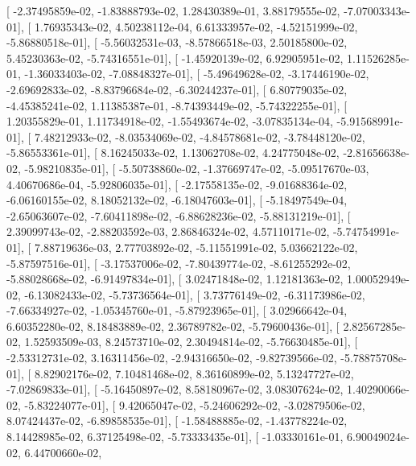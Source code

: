 \documentclass{article}
\begin{document}
       [ -2.37495859e-02,  -1.83888793e-02,   1.28430389e-01,
          3.88179555e-02,  -7.07003343e-01],
       [  1.76935343e-02,   4.50238112e-04,   6.61333957e-02,
         -4.52151999e-02,  -5.86880518e-01],
       [ -5.56032531e-03,  -8.57866518e-03,   2.50185800e-02,
          5.45230363e-02,  -5.74316551e-01],
       [ -1.45920139e-02,   6.92905951e-02,   1.11526285e-01,
         -1.36033403e-02,  -7.08848327e-01],
       [ -5.49649628e-02,  -3.17446190e-02,  -2.69692833e-02,
         -8.83796684e-02,  -6.30244237e-01],
       [  6.80779035e-02,  -4.45385241e-02,   1.11385387e-01,
         -8.74393449e-02,  -5.74322255e-01],
       [  1.20355829e-01,   1.11734918e-02,  -1.55493674e-02,
         -3.07835134e-04,  -5.91568991e-01],
       [  7.48212933e-02,  -8.03534069e-02,  -4.84578681e-02,
         -3.78448120e-02,  -5.86553361e-01],
       [  8.16245033e-02,   1.13062708e-02,   4.24775048e-02,
         -2.81656638e-02,  -5.98210835e-01],
       [ -5.50738860e-02,  -1.37669747e-02,  -5.09517670e-03,
          4.40670686e-04,  -5.92806035e-01],
       [ -2.17558135e-02,  -9.01688364e-02,  -6.06160155e-02,
          8.18052132e-02,  -6.18047603e-01],
       [ -5.18497549e-04,  -2.65063607e-02,  -7.60411898e-02,
         -6.88628236e-02,  -5.88131219e-01],
       [  2.39099743e-02,  -2.88203592e-03,   2.86846324e-02,
          4.57110171e-02,  -5.74754991e-01],
       [  7.88719636e-03,   2.77703892e-02,  -5.11551991e-02,
          5.03662122e-02,  -5.87597516e-01],
       [ -3.17537006e-02,  -7.80439774e-02,  -8.61255292e-02,
         -5.88028668e-02,  -6.91497834e-01],
       [  3.02471848e-02,   1.12181363e-02,   1.00052949e-02,
         -6.13082433e-02,  -5.73736564e-01],
       [  3.73776149e-02,  -6.31173986e-02,  -7.66334927e-02,
         -1.05345760e-01,  -5.87923965e-01],
       [  3.02966642e-04,   6.60352280e-02,   8.18483889e-02,
          2.36789782e-02,  -5.79600436e-01],
       [  2.82567285e-02,   1.52593509e-03,   8.24573710e-02,
          2.30494814e-02,  -5.76630485e-01],
       [ -2.53312731e-02,   3.16311456e-02,  -2.94316650e-02,
         -9.82739566e-02,  -5.78875708e-01],
       [  8.82902176e-02,   7.10481468e-02,   8.36160899e-02,
          5.13247727e-02,  -7.02869833e-01],
       [ -5.16450897e-02,   8.58180967e-02,   3.08307624e-02,
          1.40290066e-02,  -5.83224077e-01],
       [  9.42065047e-02,  -5.24606292e-02,  -3.02879506e-02,
          8.07424437e-02,  -6.89858535e-01],
       [ -1.58488885e-02,  -1.43778224e-02,   8.14428985e-02,
          6.37125498e-02,  -5.73333435e-01],
       [ -1.03330161e-01,   6.90049024e-02,   6.44700660e-02,
\end{document}
